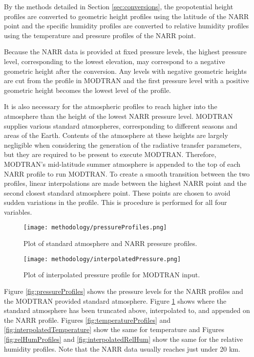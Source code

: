 \documentclass{book}
\begin{document}
By the methods detailed in Section \ref{sec:conversions}, the geopotential height profiles are converted to geometric height profiles using the latitude of the NARR point and the specific humidity profiles are converted to relative humidity profiles using the temperature and pressure profiles of the NARR point.

Because the NARR data is provided at fixed pressure levels, the highest pressure level, corresponding to the lowest elevation, may correspond to a negative geometric height after the conversion.  Any levels with negative geometric heights are cut from the profile in MODTRAN and the first pressure level with a positive geometric height becomes the lowest level of the profile.

It is also necessary for the atmospheric profiles to reach higher into the atmosphere than the height of the lowest NARR pressure level.  MODTRAN supplies various standard atmospheres, corresponding to different seasons and areas of the Earth.  Contents of the atmosphere at these heights are largely negligible when considering the generation of the radiative transfer parameters, but they are required to be present to execute MODTRAN.  Therefore, MODTRAN's mid-latitude summer atmosphere is appended to the top of each NARR profile to run MODTRAN.  To create a smooth transition between the two profiles, linear interpolations are made between the highest NARR point and the second closest standard atmosphere point.  These points are chosen to avoid sudden variations in the profile.  This is procedure is performed for all four variables.

\begin{figure}[H]
\begin{minipage}[b]{0.47\textwidth}
\centering
\texttt{[image: methodology/pressureProfiles.png]}
\caption{Plot of standard atmosphere and NARR pressure profiles.}
\label{fig:pressureProfiles}
\end{minipage}
\begin{minipage}[b]{0.47\textwidth}
\centering
\texttt{[image: methodology/interpolatedPressure.png]}
\caption{Plot of interpolated pressure profile for MODTRAN input.}
\label{fig:interpolatedPressure}
\end{minipage}
\end{figure}

Figure \ref{fig:pressureProfiles} shows the pressure levels for the NARR profiles and the MODTRAN provided standard atmosphere.  Figure \ref{fig:interpolatedPressure} shows where the standard atmosphere has been truncated above, interpolated to, and appended on the NARR profile.  Figures \ref{fig:temperatureProfiles} and \ref{fig:interpolatedTemperature} show the same for temperature and Figures \ref{fig:relHumProfiles} and \ref{fig:interpolatedRelHum} show the same for the relative humidity profiles.  Note that the NARR data usually reaches just under 20 km.
\end{document}
